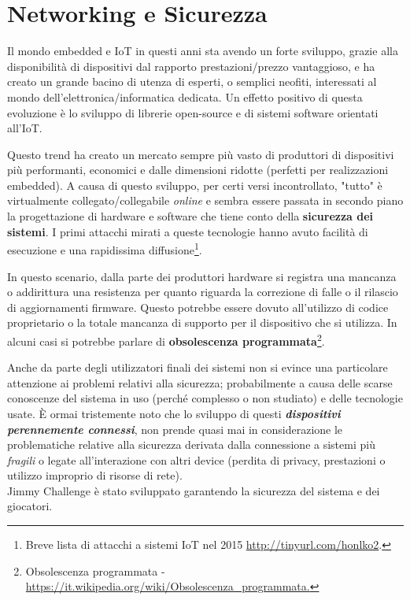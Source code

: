 \chapter{Networking e Sicurezza}

Il mondo embedded e IoT in questi anni sta avendo un forte sviluppo, grazie alla disponibilità di dispositivi dal rapporto prestazioni/prezzo vantaggioso, e ha creato un grande bacino di utenza di esperti, o semplici neofiti, interessati al mondo dell'elettronica/informatica dedicata. Un effetto positivo di questa evoluzione è lo sviluppo di librerie open-source e di sistemi software orientati all'IoT.

Questo trend ha creato un mercato sempre più vasto di produttori di dispositivi più performanti, economici e dalle dimensioni ridotte (perfetti per realizzazioni embedded).
A causa di questo sviluppo, per certi versi incontrollato, "tutto" è virtualmente collegato/collegabile \textit{online} e sembra essere passata in secondo piano la progettazione di hardware e software che tiene conto della \textbf{sicurezza dei sistemi}. I primi attacchi mirati a queste tecnologie hanno avuto facilità di esecuzione e una rapidissima diffusione\footnote{Breve lista di attacchi a sistemi IoT nel 2015 \url{http://tinyurl.com/honlko2}.}.

In questo scenario, dalla parte dei produttori hardware si registra una mancanza o addirittura una resistenza per quanto riguarda la correzione di falle o il rilascio di aggiornamenti firmware. Questo potrebbe essere dovuto all'utilizzo di codice proprietario o la totale mancanza di supporto per il dispositivo che si utilizza. In alcuni casi si potrebbe parlare di \textbf{obsolescenza programmata}\footnote{Obsolescenza programmata - \url{https://it.wikipedia.org/wiki/Obsolescenza_programmata.}}.

Anche da parte degli utilizzatori finali dei sistemi non si evince una particolare attenzione ai problemi relativi alla sicurezza; probabilmente a causa delle scarse conoscenze del sistema in uso (perché complesso o non studiato) e delle tecnologie usate. È ormai tristemente noto che lo sviluppo di questi \textbf{\textit{dispositivi perennemente connessi}}, non prende quasi mai in considerazione le problematiche relative alla sicurezza derivata dalla connessione a sistemi più \textit{fragili} o legate all'interazione con altri device (perdita di privacy, prestazioni o utilizzo improprio di risorse di rete).\\

Jimmy Challenge è stato sviluppato garantendo la sicurezza del sistema e dei giocatori.\\

